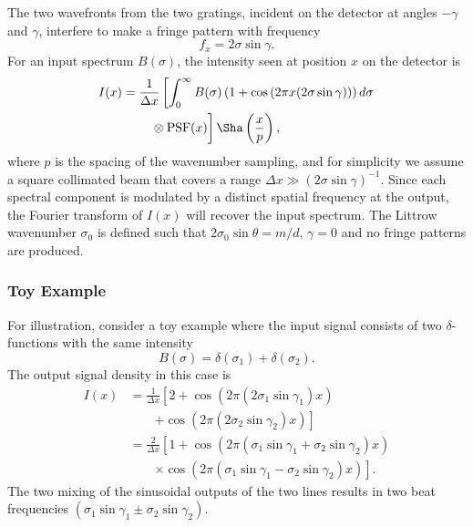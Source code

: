 \documentclass[preprint2, 10pt]{aastex}
\begin{document}
{The two wavefronts from the two gratings, incident on the detector at angles $-\gamma$ and $\gamma$, interfere to make a fringe
pattern with  frequency
\begin{equation}
f_x=2\sigma\sin{\gamma}.
\end{equation}
For an input spectrum $B(\sigma)$, the intensity seen at position $x$ on the detector is
\begin{align}
I(x)& =\frac{1}{\Delta x}\left[\int_{0}^{\infty} B(\sigma)\left(1+\cos{\left(2 \pi x (2\sigma \sin{\gamma})\right)}\right)d\sigma \right. \nonumber \\
& \qquad \left.\vphantom{\int_{0}^{\infty}} \otimes \mbox{PSF}(x)\right]\Sha\left(\frac{x}{p}\right),
\end{align}
where  $p$ is the spacing of the wavenumber sampling, and for simplicity we assume a square collimated beam that covers
a range  $\Delta x \gg \left(2\sigma \sin{\gamma}\right)^{-1}$.
Since each spectral component is modulated by a distinct spatial
frequency at the output, the Fourier transform of $I(x)$ will recover the
input spectrum.
The Littrow wavenumber $\sigma_0$ is defined such that $2\sigma_0\sin{\theta}=m/d$, $\gamma=0$ and no fringe patterns are produced.

\subsubsection{Toy Example}
\label{toy:sec} 

For illustration, consider a toy example where the input signal consists of two $\delta$-functions with the same intensity
\begin{equation}
B(\sigma)=\delta(\sigma_1)+\delta(\sigma_2).
\end{equation}
The output signal density in this case is
\begin{align}
I(x)&=\frac{1}{\Delta x}\left[2+ \cos{\left(2 \pi (2\sigma_1  \sin{\gamma_1})x \right)} \right. \nonumber \\
& \qquad \left.+ \cos{\left(2\pi (2  \sigma_2  \sin{\gamma_2})x \right)}\right]\\
&=\frac{2}{\Delta x}\left[1+ \cos{\left(2 \pi  (\sigma_1  \sin{\gamma_1}+ \sigma_2  \sin{\gamma_2})x \right)}  \right. \nonumber \\
& \qquad \left. \times\cos{\left(2\pi  (\sigma_1  \sin{\gamma_1}- \sigma_2  \sin{\gamma_2})x\right)}\right].
\end{align}
The two mixing of the sinusoidal outputs of the two lines results in two beat frequencies $(\sigma_1  \sin{\gamma_1}\pm\sigma_2  \sin{\gamma_2})$.

}
\end{document}
